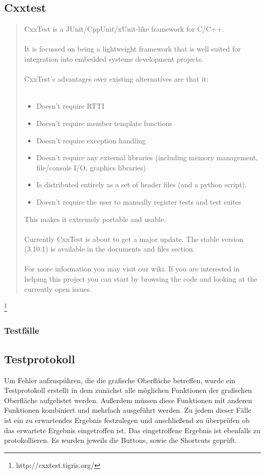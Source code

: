 \subsection{Cxxtest}
\begin{quote}
CxxTest is a JUnit/CppUnit/xUnit-like framework for C/C++.\ \\ \\
It is focussed on being a lightweight framework that is well suited for 
integration into embedded systems development projects.\ \\ \\
CxxTest's advantages over existing alternatives are that it:\ \\ \\
\begin{itemize}
	\item Doesn't require RTTI
    	\item Doesn't require member template functions
    	\item Doesn't require exception handling
	\item Doesn't require any external libraries (including memory management, file/console I/O, graphics libraries)
	\item Is distributed entirely as a set of header files (and a python script).
	\item Doesn't require the user to manually register tests and test suites 
\end{itemize}
This makes it extremely portable and usable.\ \\ \\
Currently CxxTest is about to get a major update. The stable version 
(3.10.1) is available in the documents and files section.\ \\ \\
For more information you may visit our wiki. If you are interested in 
helping this project you can start by browsing the code and looking at the 
currently open issues. 
\end{quote} \footnote{http://cxxtest.tigris.org/}
\subsubsection{Testfälle}
\subsection{Testprotokoll}
Um Fehler aufzuspühren, die die grafische Oberfläche betreffen, wurde ein Testprotokoll erstellt in dem zunächst
alle möglichen Funktionen der grafischen Oberfläche aufgelistet werden. Außerdem müssen diese Funktionen mit 
anderen Funktionen kombiniert und mehrfach ausgeführt werden. Zu jedem dieser Fälle ist ein zu erwartendes Ergebnis
festzulegen und anschließend zu überprüfen ob das erwartete Ergebnis eingetroffen ist. Das eingetroffene Ergebnis
ist ebenfalls zu protokollieren. Es wurden jeweils die Buttons, sowie die Shortcuts geprüft.
